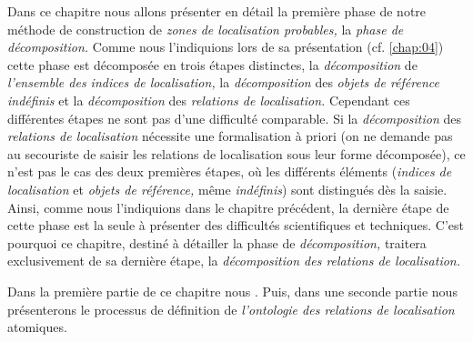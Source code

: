 Dans ce chapitre nous allons présenter en détail la première phase de
notre méthode de construction de \emph{zones de localisation
  probables,} la \emph{phase de décomposition.} Comme nous
l'indiquions lors de sa présentation (cf. \autoref{chap:04}) cette
phase est décomposée en trois étapes distinctes, la
\emph{décomposition} de \emph{l'ensemble des indices de localisation,}
la \emph{décomposition} des \emph{objets de référence indéfinis} et la
\emph{décomposition} des \emph{relations de localisation.} Cependant
ces différentes étapes ne sont pas d'une difficulté comparable. Si la
\emph{décomposition} des \emph{relations de localisation} nécessite
une formalisation à priori (on ne demande pas au secouriste de saisir
les relations de localisation sous leur forme décomposée), ce n'est
pas le cas des deux premières étapes, où les différents éléments
(\emph{indices de localisation} et \emph{objets de référence,} même
\emph{indéfinis}) sont distingués dès la saisie. Ainsi, comme nous
l'indiquions dans le chapitre précédent, la dernière étape de cette
phase est la seule à présenter des difficultés scientifiques et
techniques. C'est pourquoi ce chapitre, destiné à détailler la phase
de \emph{décomposition,} traitera exclusivement de sa dernière étape,
la \emph{décomposition des relations de localisation.}

Dans la première partie de ce chapitre nous . Puis, dans une seconde
partie nous présenterons le processus de définition de
\emph{l'ontologie des relations de localisation} atomiques.

